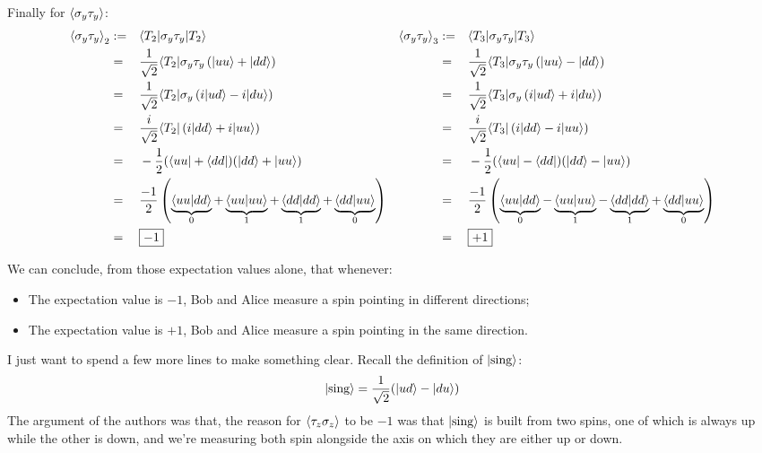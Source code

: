 \documentclass[solutions.tex]{subfiles}
\begin{document}
Finally for $\left\langle \sigma_y\tau_y \right\rangle$:
\begin{equation*}\begin{aligned}
	\left\langle \sigma_y\tau_y \right\rangle_2 &:=&& \langle T_2|\sigma_y\tau_y|T_2\rangle
	& \left\langle \sigma_y\tau_y \right\rangle_3 &:=&& \langle T_3|\sigma_y\tau_y|T_3\rangle \\
	~ &=&& \frac1{\sqrt2}\langle T_2|\sigma_y\tau_y\left(|uu\rangle+|dd\rangle\right)
	& ~ &=&& \frac1{\sqrt2}\langle T_3|\sigma_y\tau_y\left(|uu\rangle-|dd\rangle\right) \\
	~ &=&& \frac1{\sqrt2}\langle T_2|\sigma_y\left(i|ud\rangle-i|du\rangle\right)
	& ~ &=&& \frac1{\sqrt2}\langle T_3|\sigma_y\left(i|ud\rangle+i|du\rangle\right) \\
	~ &=&& \frac{i}{\sqrt2}\langle T_2|\left(i|dd\rangle+i|uu\rangle\right)
	& ~ &=&& \frac{i}{\sqrt2}\langle T_3|\left(i|dd\rangle-i|uu\rangle\right) \\
	~ &=&& -\frac12(\langle uu|+\langle dd|)(|dd\rangle+|uu\rangle)
	& ~ &=&& -\frac12(\langle uu|-\langle dd|)(|dd\rangle-|uu\rangle) \\
	~ &=&& \frac{-1}2\left(
		\underbrace{\left\langle uu \middle| dd \right\rangle}_{0}
		+\underbrace{\left\langle uu \middle| uu \right\rangle}_{1}
		+\underbrace{\left\langle dd \middle| dd \right\rangle}_{1}
		+\underbrace{\left\langle dd \middle| uu \right\rangle}_{0}
	\right)
	& ~ &=&& \frac{-1}2\left(
		\underbrace{\left\langle uu \middle| dd \right\rangle}_{0}
		-\underbrace{\left\langle uu \middle| uu \right\rangle}_{1}
		-\underbrace{\left\langle dd \middle| dd \right\rangle}_{1}
		+\underbrace{\left\langle dd \middle| uu \right\rangle}_{0}
	\right) \\
	~ &=&& \boxed{-1}
	& ~ &=&& \boxed{+1}
\end{aligned}\end{equation*}

We can conclude, from those expectation values alone, that whenever:
\begin{itemize}
	\item The expectation value is $-1$, Bob and Alice measure
	a spin pointing in different directions;
	\item The expectation value is $+1$, Bob and Alice measure
	a spin pointing in the same direction.
\end{itemize}

I just want to spend a few more lines to make something clear. Recall
the definition of $|\text{sing}\rangle$:
\[
	|\text{sing}\rangle = \frac1{\sqrt2}(|ud\rangle-|du\rangle)
\]
The argument of the authors was that, the reason for $\left\langle \tau_z\sigma_z \right\rangle$
to be $-1$ was that $|\text{sing}\rangle$ is built from two spins,
one of which is always up while the other is down, and we're measuring
both spin alongside the axis on which they are either up or down. \\
\end{document}
